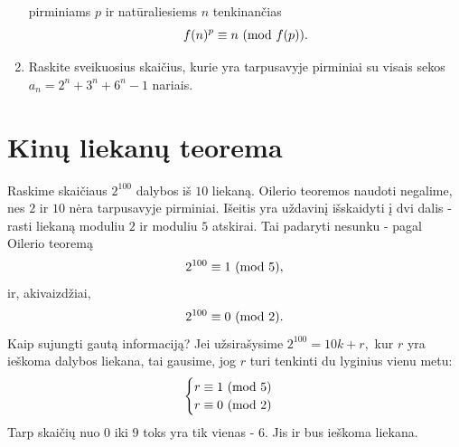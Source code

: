 \begin{enumerate}
    pirminiams $p$ ir natūraliesiems $n$ tenkinančias $$f(n)^p \equiv n
    \ (\text{mod } f(p)).$$
    \item \text{[IMO 2005]} Raskite sveikuosius skaičius, kurie yra
    tarpusavyje pirminiai su visais sekos $a_n = 2^n + 3^n + 6^n - 1$
    nariais.

\end{enumerate}
\newpage

\section{Kinų liekanų teorema}

Raskime skaičiaus $2^{100}$ dalybos iš $10$ liekaną. Oilerio teoremos
naudoti negalime, nes $2$ ir $10$ nėra tarpusavyje pirminiai. Išeitis yra
uždavinį išskaidyti į dvi dalis - rasti liekaną moduliu $2$ ir moduliu
$5$ atskirai. Tai padaryti nesunku - pagal Oilerio teoremą $$2^{100} \equiv
1 \ (\text{mod } 5),$$ ir, akivaizdžiai, $$2^{100} \equiv 0 \ (\text{mod } 2).$$ Kaip sujungti gautą
informaciją? Jei užsirašysime $2^{100} = 10k + r,$ kur $r$ yra ieškoma
dalybos liekana, tai gausime, jog $r$ turi tenkinti du lyginius vienu metu:
$$\begin{cases}
  r \equiv 1 \ (\text{mod } 5) \\
  r \equiv 0 \ (\text{mod } 2)
\end{cases}$$
Tarp skaičių nuo $0$ iki $9$ toks yra tik vienas - $6$. Jis ir bus ieškoma
liekana.

